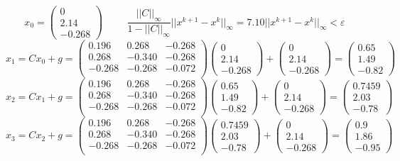 \documentclass[11pt,a4paper]{article}
\let\epsilon\varepsilon
\renewcommand\;{\hspace{1cm}}
\begin{document}
\[
  x_{0} = \begin{pmatrix}
    0 \\ 2.14 \\ -0.268
  \end{pmatrix} \; \frac{||C||_{\infty}}{1-||C||_{\infty}}||x^{k+1}-x^{k}||_{\infty} = 7.10 ||x^{k+1}-x^{k}||_{\infty} < \epsilon
\]\[
  x_{1} = Cx_{0} + g = \begin{pmatrix}
    0.196 & 0.268 & -0.268\\
    0.268 & -0.340 & -0.268\\
    -0.268 & -0.268 & -0.072\\
  \end{pmatrix} \begin{pmatrix}
    0 \\ 2.14 \\ -0.268
  \end{pmatrix} + \begin{pmatrix}
    0 \\ 2.14 \\ -0.268
  \end{pmatrix} = \begin{pmatrix}
      0.65 \\ 1.49 \\ -0.82
    \end{pmatrix}
\]\[
  x_{2} = Cx_{1} + g = \begin{pmatrix}
    0.196 & 0.268 & -0.268\\
    0.268 & -0.340 & -0.268\\
    -0.268 & -0.268 & -0.072\\
  \end{pmatrix} \begin{pmatrix}
      0.65 \\ 1.49 \\ -0.82
    \end{pmatrix} + \begin{pmatrix}
    0 \\ 2.14 \\ -0.268
  \end{pmatrix} = \begin{pmatrix}
      0.7459 \\ 2.03 \\ -0.78
    \end{pmatrix}
  \]\[
  x_{3} = Cx_{2} + g = \begin{pmatrix}
    0.196 & 0.268 & -0.268\\
    0.268 & -0.340 & -0.268\\
    -0.268 & -0.268 & -0.072\\
  \end{pmatrix} \begin{pmatrix}
      0.7459 \\ 2.03 \\ -0.78
    \end{pmatrix} + \begin{pmatrix}
    0 \\ 2.14 \\ -0.268
  \end{pmatrix} = \begin{pmatrix}
      0.9 \\ 1.86 \\ -0.95
    \end{pmatrix}
\]
\end{document}
